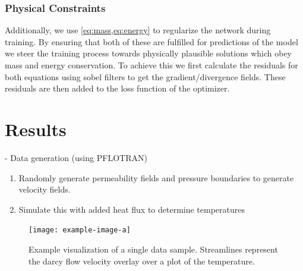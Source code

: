 \documentclass{article} %
\begin{document}




\subsubsection*{Physical Constraints}
Additionally, we use \cref{eq:mass,eq:energy} to regularize the network during training.
By ensuring that both of these are fulfilled for predictions of the model we steer the training process towards physically plausible solutions which obey mass and energy conservation.
To achieve this we first calculate the residuals for both equations using sobel filters to get the gradient/divergence fields.
These residuals are then added to the loss function of the optimizer.




\section{Results}
\label{sec:results}


- Data generation (using PFLOTRAN)
\begin{enumerate}
\item Randomly generate permeability fields and pressure boundaries to generate velocity fields.
\item Simulate this with added heat flux to determine temperatures
\end{enumerate}


\begin{figure}[htb]
   \centering
   \texttt{[image: example-image-a]}
   \caption{Example visualization of a single data sample. Streamlines represent the darcy flow velocity overlay over a plot of the temperature.}
\end{figure}
\end{document}
